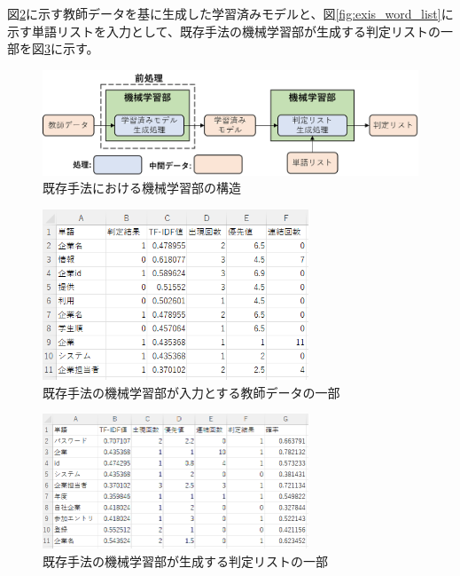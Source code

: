 図\ref{fig:exis_teach}に示す教師データを基に生成した学習済みモデルと、図\ref{fig:exis_word_list}に示す単語リストを入力として、既存手法の機械学習部が生成する判定リストの一部を図\ref{fig:exis_judge_list}に示す。

\begin{figure}[tp]
    \begin{center}
        \includegraphics[width=1.0\columnwidth]{image/exis_machine_structure.png}
        \caption{既存手法における機械学習部の構造}
        \label{fig:exis_machine_structure}
    \end{center}
\end{figure}

\begin{figure}[tp]
    \begin{center}
        \includegraphics[width=300]{image/exis_teach.png}
        \caption{既存手法の機械学習部が入力とする教師データの一部}
        \label{fig:exis_teach}
    \end{center}
\end{figure}

\begin{figure}[tp]
    \begin{center}
        \includegraphics[width=300]{image/exis_judge_list.png}
        \caption{既存手法の機械学習部が生成する判定リストの一部}
        \label{fig:exis_judge_list}
    \end{center}
\end{figure}

